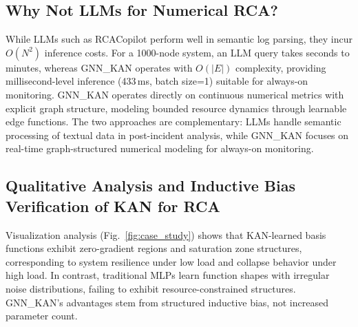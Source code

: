 \documentclass[conference]{IEEEtran}
\begin{document}
\subsection{Why Not LLMs for Numerical RCA?}

While LLMs such as RCACopilot perform well in semantic log parsing, they incur $O(N^2)$ inference costs. For a 1000-node system, an LLM query takes seconds to minutes, whereas GNN\_KAN operates with $O(|E|)$ complexity, providing millisecond-level inference (433\,ms, batch size=1) suitable for always-on monitoring. GNN\_KAN operates directly on continuous numerical metrics with explicit graph structure, modeling bounded resource dynamics through learnable edge functions. The two approaches are complementary: LLMs handle semantic processing of textual data in post-incident analysis, while GNN\_KAN focuses on real-time graph-structured numerical modeling for always-on monitoring.

\subsection{Qualitative Analysis and Inductive Bias Verification of KAN for RCA}

Visualization analysis (Fig.~\ref{fig:case_study}) shows that KAN-learned basis functions exhibit zero-gradient regions and saturation zone structures, corresponding to system resilience under low load and collapse behavior under high load. In contrast, traditional MLPs learn function shapes with irregular noise distributions, failing to exhibit resource-constrained structures. GNN\_KAN's advantages stem from structured inductive bias, not increased parameter count.
\end{document}
